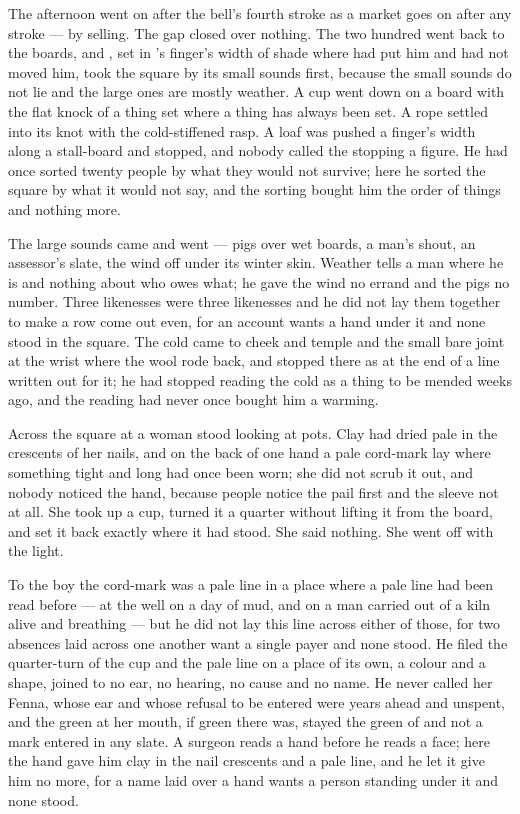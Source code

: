 The afternoon went on after the bell's fourth stroke as a market goes on after any stroke --- by selling. The gap closed over nothing. The two hundred went back to the boards, and , set in 's finger's width of shade where  had put him and had not moved him, took the square by its small sounds first, because the small sounds do not lie and the large ones are mostly weather. A cup went down on a board with the flat knock of a thing set where a thing has always been set. A rope settled into its knot with the cold-stiffened rasp. A loaf was pushed a finger's width along a stall-board and stopped, and nobody called the stopping a figure. He had once sorted twenty people by what they would not survive; here he sorted the square by what it would not say, and the sorting bought him the order of things and nothing more.

The large sounds came and went --- pigs over wet boards, a man's shout, an assessor's slate, the wind off  under its winter skin. Weather tells a man where he is and nothing about who owes what; he gave the wind no errand and the pigs no number. Three likenesses were three likenesses and he did not lay them together to make a row come out even, for an account wants a hand under it and none stood in the square. The cold came to cheek and temple and the small bare joint at the wrist where the wool rode back, and stopped there as at the end of a line written out for it; he had stopped reading the cold as a thing to be mended weeks ago, and the reading had never once bought him a warming.

Across the square at  a woman stood looking at pots. Clay had dried pale in the crescents of her nails, and on the back of one hand a pale cord-mark lay where something tight and long had once been worn; she did not scrub it out, and nobody noticed the hand, because people notice the pail first and the sleeve not at all. She took up a cup, turned it a quarter without lifting it from the board, and set it back exactly where it had stood. She said nothing. She went off with the light.

To the boy the cord-mark was a pale line in a place where a pale line had been read before --- at the well on a day of mud, and on a man carried out of a kiln alive and breathing --- but he did not lay this line across either of those, for two absences laid across one another want a single payer and none stood. He filed the quarter-turn of the cup and the pale line on a place of its own, a colour and a shape, joined to no ear, no hearing, no cause and no name. He never called her Fenna, whose ear and whose refusal to be entered were years ahead and unspent, and the green at her mouth, if green there was, stayed the green of  and not a mark entered in any slate. A surgeon reads a hand before he reads a face; here the hand gave him clay in the nail crescents and a pale line, and he let it give him no more, for a name laid over a hand wants a person standing under it and none stood.

